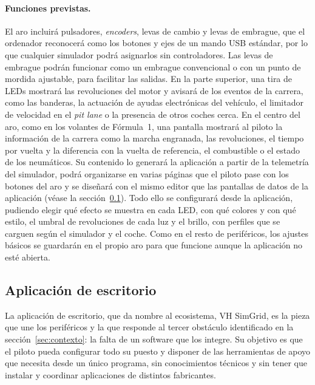 \paragraph{Funciones previstas.}
El aro incluirá pulsadores, \textit{encoders}, levas de cambio y levas de embrague, que el ordenador reconocerá como los botones y ejes de un mando USB estándar, por lo que cualquier simulador podrá asignarlos sin controladores. Las levas de embrague podrán funcionar como un embrague convencional o con un punto de mordida ajustable, para facilitar las salidas. En la parte superior, una tira de LEDs mostrará las revoluciones del motor y avisará de los eventos de la carrera, como las banderas, la actuación de ayudas electrónicas del vehículo, el limitador de velocidad en el \textit{pit lane} o la presencia de otros coches cerca. En el centro del aro, como en los volantes de Fórmula~1, una pantalla mostrará al piloto la información de la carrera como la marcha engranada, las revoluciones, el tiempo por vuelta y la diferencia con la vuelta de referencia, el combustible o el estado de los neumáticos. Su contenido lo generará la aplicación a partir de la telemetría del simulador, podrá organizarse en varias páginas que el piloto pase con los botones del aro y se diseñará con el mismo editor que las pantallas de datos de la aplicación (véase la sección~\ref{sec:propuesta-app}). Todo ello se configurará desde la aplicación, pudiendo elegir qué efecto se muestra en cada LED, con qué colores y con qué estilo, el umbral de revoluciones de cada luz y el brillo, con perfiles que se carguen según el simulador y el coche. Como en el resto de periféricos, los ajustes básicos se guardarán en el propio aro para que funcione aunque la aplicación no esté abierta.

\subsection{Aplicación de escritorio}
\label{sec:propuesta-app}

La aplicación de escritorio, que da nombre al ecosistema, VH SimGrid, es la pieza que une los periféricos y la que responde al tercer obstáculo identificado en la sección~\ref{sec:contexto}: la falta de un software que los integre. Su objetivo es que el piloto pueda configurar todo su puesto y disponer de las herramientas de apoyo que necesita desde un único programa, sin conocimientos técnicos y sin tener que instalar y coordinar aplicaciones de distintos fabricantes.

